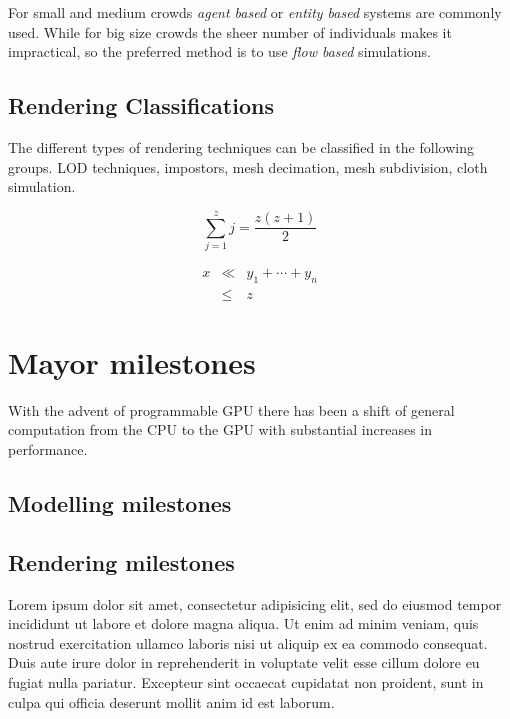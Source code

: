 \documentclass[conference]{acmsiggraph}
\begin{document}
For small and medium crowds \textit{agent based} or \textit{entity based} systems are
commonly used. While for big size crowds the sheer number of individuals
makes it impractical, so the preferred method is to use \textit{flow based}
simulations.

\subsection{Rendering Classifications}

The different types of rendering techniques can be classified in the 
following groups. LOD techniques, impostors, mesh decimation,
mesh subdivision, cloth simulation.

\begin{equation}
 \sum_{j=1}^{z} j = \frac{z(z+1)}{2}
\end{equation}

\begin{eqnarray}
x & \ll & y_{1} + \cdots + y_{n} \\
  & \leq & z
\end{eqnarray}

\section{Mayor milestones}

With the advent of programmable GPU there has been a shift of
general computation from the CPU to the GPU with substantial
increases in performance.

\subsection{Modelling milestones}

\subsection{Rendering milestones}

Lorem ipsum dolor sit amet, consectetur adipisicing elit, sed do
eiusmod tempor incididunt ut labore et dolore magna aliqua. Ut enim ad
minim veniam, quis nostrud exercitation ullamco laboris nisi ut
aliquip ex ea commodo consequat. Duis aute irure dolor in
reprehenderit in voluptate velit esse cillum dolore eu fugiat nulla
pariatur. Excepteur sint occaecat cupidatat non proident, sunt in
culpa qui officia deserunt mollit anim id est laborum.
\end{document}
